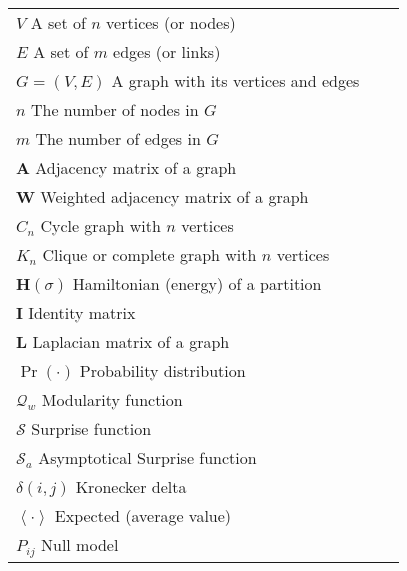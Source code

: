 \begin{longtable}{@{}*{3}{p{\textwidth}@{}}}
$V$ \quad {\color{gray!50}\hrulefill} \quad  A set of $n$ vertices (or nodes) \\
$E$ \quad {\color{gray!50}\hrulefill} \quad  A set of $m$ edges (or links) \\
$G=(V,E)$ \quad {\color{gray!50}\hrulefill} \quad  A graph with its vertices and edges \\
$n$ \quad {\color{gray!50}\hrulefill} \quad  The number of nodes in $G$ \\
$m$ \quad {\color{gray!50}\hrulefill} \quad  The number of edges in $G$ \\
$\mathbf{A}$ \quad {\color{gray!50}\hrulefill} \quad  Adjacency matrix of a graph \\
$\mathbf{W}$ \quad {\color{gray!50}\hrulefill} \quad  Weighted adjacency matrix of a graph \\
$C_n$ \quad {\color{gray!50}\hrulefill} \quad  Cycle graph with $n$ vertices \\
$K_n$ \quad {\color{gray!50}\hrulefill} \quad  Clique or complete graph with $n$ vertices \\
$\mathbf{H}(\sigma)$ \quad {\color{gray!50}\hrulefill} \quad  Hamiltonian (energy) of a partition \\
$\mathbf{I}$ \quad {\color{gray!50}\hrulefill} \quad  Identity matrix \\
$\mathbf{L}$ \quad {\color{gray!50}\hrulefill} \quad  Laplacian matrix of a graph \\
$\Pr(\cdot)$ \quad {\color{gray!50}\hrulefill} \quad  Probability distribution \\
$\mathcal{Q}_w$ \quad {\color{gray!50}\hrulefill} \quad  Modularity function \\
$\mathcal{S}$ \quad {\color{gray!50}\hrulefill} \quad  Surprise function \\
$\mathcal{S}_a$ \quad {\color{gray!50}\hrulefill} \quad  Asymptotical Surprise function \\
$\delta(i,j)$ \quad {\color{gray!50}\hrulefill} \quad  Kronecker delta \\
$\left<\cdot \right>$ \quad {\color{gray!50}\hrulefill} \quad  Expected (average value) \\
$P_{ij}$ \quad {\color{gray!50}\hrulefill} \quad  Null model \\

\end{longtable}
